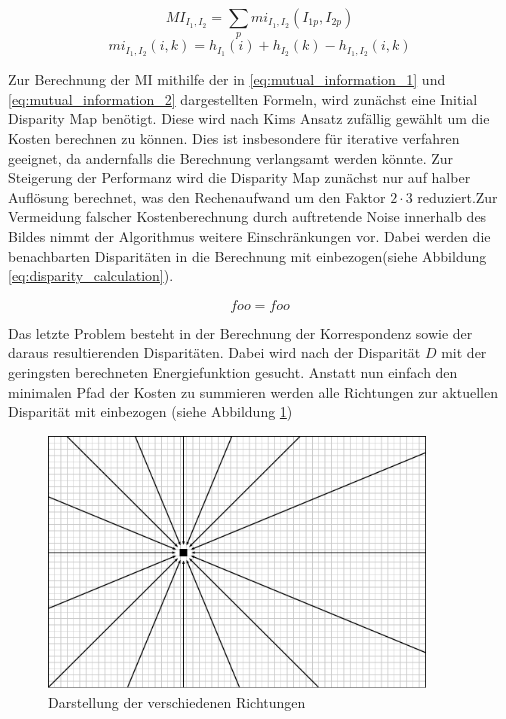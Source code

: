 \begin{equation}\label{eq:mutual_information_1}
MI_{I_1,I_2} = \sum_{p} mi_{I_1,I_2}(I_{1p},I_{2p})
\end{equation}
\begin{equation}\label{eq:mutual_information_2}
mi_{I_1,I_2} (i,k) = h_{I_1}(i)+h_{I_2}(k)-h_{I_1,I_2}(i,k)
\end{equation}

\noindent
Zur Berechnung der MI mithilfe der in \ref{eq:mutual_information_1} und \ref{eq:mutual_information_2} dargestellten Formeln, wird zunächst eine Initial Disparity Map benötigt. Diese wird nach Kims  \cite{zureiki2008stereo} Ansatz zufällig gewählt um die Kosten berechnen zu können. Dies ist insbesondere für iterative verfahren geeignet, da andernfalls die Berechnung verlangsamt werden könnte. Zur Steigerung der Performanz wird die Disparity Map zunächst nur auf halber Auflösung berechnet, was den Rechenaufwand um den Faktor $2 \cdot 3$ reduziert.Zur Vermeidung falscher Kostenberechnung durch auftretende Noise innerhalb des Bildes nimmt der Algorithmus weitere Einschränkungen vor. Dabei werden die benachbarten Disparitäten in die Berechnung mit einbezogen(siehe Abbildung \ref{eq:disparity_calculation}).

\begin{equation}\label{eq:disparity_calculation}
 foo = foo
\end{equation}

\noindent
Das letzte Problem besteht in der Berechnung der Korrespondenz sowie der daraus resultierenden Disparitäten. Dabei wird nach der Disparität $D$ mit der geringsten berechneten Energiefunktion gesucht. Anstatt nun einfach den minimalen Pfad der Kosten zu summieren werden alle Richtungen zur aktuellen Disparität mit einbezogen (siehe Abbildung \ref{fig:sgm_directions})

\begin{figure}
	\begin{center}
		\includegraphics[width=10cm]{img/sgm_directions.pdf}
	\end{center}
	\caption{Darstellung der verschiedenen Richtungen}
	\label{fig:sgm_directions}
\end{figure}

